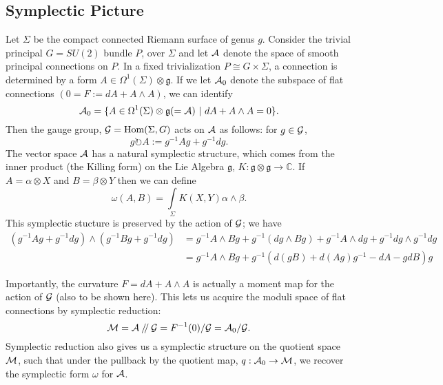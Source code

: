 	\subsection{Symplectic Picture}
	 Let $\Sigma$ be the compact connected Riemann surface of genus $g$. Consider the trivial principal $G=SU(2)$ bundle $P$, over $\Sigma$ and let $\mathcal{A}$ denote the space of smooth principal connections on $P$. In a fixed trivialization $P \cong G\times \Sigma$, a connection is determined by a form $A \in \Omega^1(\Sigma)\otimes \mathfrak{g}$. If we let $\mathcal{A}_0$ denote the subspace of flat connections $(0 = F:=dA + A\wedge A)$, we can identify
	\begin{equation}
	\mathcal{A}_0 = \{A \in \Omega^1(\Sigma)\otimes\mathfrak{g} (=\mathcal{A}) ~|~ dA + A\wedge A = 0\}.
	\end{equation}
	Then the gauge group, $\mathcal{G} = \text{Hom}(\Sigma, G)$ acts on $\mathcal{A}$ as follows: for $g\in \mathcal{G}$,
	\begin{equation}
	g\circlearrowright A := g^{-1}Ag + g^{-1}dg.
	\end{equation}
	The vector space $\mathcal{A}$ has a natural symplectic structure, which comes from the inner product (the Killing form) on the Lie Algebra $\mathfrak{g}$, $K:\mathfrak{g}\otimes\mathfrak{g}\to\mathbb{C}$. If $A = \alpha \otimes X$ and $B = \beta \otimes Y$ then we can define
	\begin{equation}
	\omega(A,B) = \int\limits_\Sigma K(X,Y)\alpha\wedge \beta.
	\end{equation}
	This symplectic stucture is preserved by the action of $\mathcal{G}$; we have
	\begin{align*}
	(g^{-1} A g + g^{-1}dg) \wedge (g^{-1} B g + g^{-1}dg) &= g^{-1}A\wedge B g + g^{-1}(dg\wedge Bg) + g^{-1}A\wedge dg + g^{-1}dg \wedge g^{-1}dg \\
	&= g^{-1} A\wedge B g + g^{-1}(d(gB) + d(Ag)g^{-1} - dA - gdB)g
	\end{align*}
	
	Importantly, the curvature $F = dA + A\wedge A$ is actually a moment map for the action of $\mathcal{G}$ (also to be shown here). This lets us acquire the moduli space of flat connections by symplectic reduction:
	\begin{equation}
	\mathcal{M} = \mathcal{A}\mathbin{/\mkern-4mu/}\mathcal{G} = F^{-1}(0)/ \mathcal{G}= \mathcal{A}_0/ \mathcal{G}.
	\end{equation} 
	Symplectic reduction also gives us a symplectic structure on the quotient space $\mathcal{M}$, such that under the pullback by the quotient map, $q:\mathcal{A}_0 \to \mathcal{M}$, we recover the symplectic form $\omega$ for $\mathcal{A}$.

